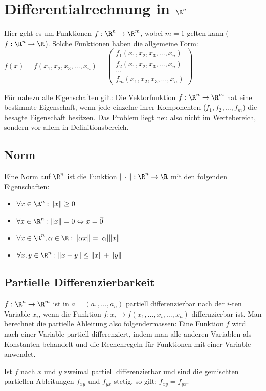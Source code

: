 \section{Differentialrechnung in $\R^n$}
Hier geht es um Funktionen $f: \R^n \to \R^m$, wobei $m=1$ gelten kann
($f: \R^n \to \R$). Solche Funktionen haben die allgemeine Form:
$f(x) = f(x_1, x_2, x_3, \ldots, x_n) = \begin{pmatrix}
f_1(x_1, x_2, x_3, \ldots, x_n)\\
f_2(x_1, x_2, x_3, \ldots, x_n)\\
\ldots\\
f_m(x_1, x_2, x_3, \ldots, x_n)
\end{pmatrix}$

Für nahezu alle Eigenschaften gilt: Die Vektorfunktion $f: \R^n \to \R^m$ hat
eine bestimmte Eigenschaft, wenn jede einzelne ihrer Komponenten
($f_1, f_2, \ldots, f_m$) die besagte Eigenschaft besitzen. Das Problem liegt
neu also nicht im Wertebereich, sondern vor allem in Definitionsbereich.

\subsection{Norm}
Eine Norm auf $\R^n$ ist die Funktion $\|\cdot\|: \R^n \to \R$ mit den folgenden
Eigenschaften:
\begin{itemize}
	\item $\forall x \in \R^n: \|x\| \geq 0$
	\item $\forall x \in \R^n: \|x\| = 0 \Leftrightarrow x = \vec{0}$
	\item $\forall x \in \R^n, \alpha \in \R: \|\alpha x\| = |\alpha| \|x\|$
	\item $\forall x,y \in \R^n: \|x + y\| \leq \|x\|+\|y\|$
\end{itemize}

\subsection{Partielle Differenzierbarkeit}
$f: \R^n \to \R^m$ ist in $a = (a_1, \ldots, a_n)$ partiell differenzierbar nach
der $i$-ten Variable $x_i$, wenn die Funktion
$f: x_i \to f(x_1, \ldots, x_i, \ldots, x_n)$ differnzierbar ist. Man berechnet
die partielle Ableitung also folgendermassen: Eine Funktion $f$ wird nach einer
Variable partiell differenziert, indem man alle anderen Variablen als Konstanten
behandelt und die Rechenregeln für Funktionen mit einer Variable anwendet.

\begin{satz}
Ist $f$ nach $x$ und $y$ zweimal partiell differenzierbar und sind die gemischten
partiellen Ableitungen $f_{xy}$ und $f_{yx}$ stetig, so gilt: $f_{xy} = f_{yx}$.
\end{satz}